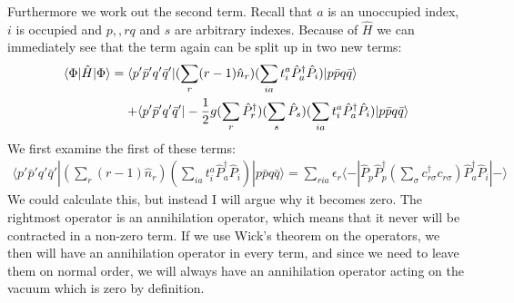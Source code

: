 \documentclass[norsk,a4paper,12pt]{article}
\begin{document}
Furthermore we work out the second term. Recall that $a$ is an unoccupied index, $i$ is occupied and $p, , rq$ and $s$ are arbitrary indexes. Because of $\hat{H}$ we can immediately see that the term again can be split up in two new terms:
\begin{align*}
\langle\Phi|\hat{H}|\Phi\rangle&=\langle p'\bar{p}'q'\bar{q}'|(\sum_r(r-1)\hat{n}_r)(\sum_{ia}t_i^a\hat{P}_a^{\dagger}\hat{P}_i)|p\bar{p}q\bar{q}\rangle\notag\\
&\mathrel{\phantom{=}}+\langle p'\bar{p}'q'\bar{q}'|-\frac{1}{2}g(\sum_{r}\hat{P}_r^{\dagger})(\sum_s\hat{P}_s)(\sum_{ia}t_i^a\hat{P}_a^{\dagger}\hat{P}_i)|p\bar{p}q\bar{q}\rangle
\end{align*}
We first examine the first of these terms:
\begin{align*}
\langle p'\bar{p}'q'\bar{q}'|(\sum_r(r-1)\hat{n}_r)(\sum_{ia}t_i^a\hat{P}_a^{\dagger}\hat{P}_i)|p\bar{p}q\bar{q}\rangle=\sum_{ria}\epsilon_r\langle-|\hat{P}_{p}\hat{P}_p^{\dagger}(\sum_{\sigma}c_{r\sigma}^{\dagger}c_{r\sigma})\hat{P}_a^{\dagger}\hat{P}_i|-\rangle
\end{align*}
We could calculate this, but instead I will argue why it becomes zero. The rightmost operator is an annihilation operator, which means that it never will be contracted in a non-zero term. If we use Wick's theorem on the operators, we then will have an annihilation operator in every term, and since we need to leave them on normal order, we will always have an annihilation operator acting on the vacuum which is zero by definition. 
\end{document}
